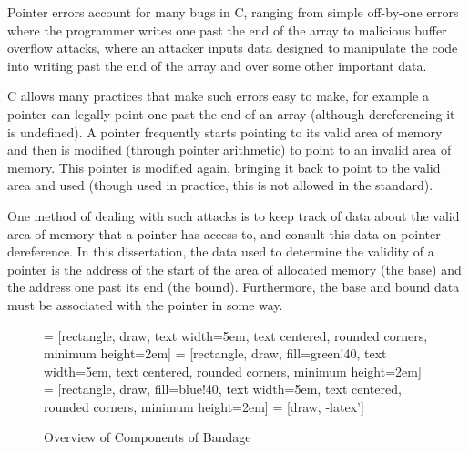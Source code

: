 \documentclass[a4paper,12pt,twoside,openright]{report}
\begin{document}
Pointer errors account for many bugs in C, ranging from simple off-by-one errors where the programmer writes one past the end of the array to malicious buffer overflow attacks, where an attacker inputs data designed to manipulate the code into writing past the end of the array and over some other important data.

C allows many practices that make such errors easy to make, for example a pointer can legally point one past the end of an array (although dereferencing it is undefined).
A pointer frequently starts pointing to its valid area of memory and then is modified (through pointer arithmetic) to point to an invalid area of memory.
This pointer is modified again, bringing it back to point to the valid area and used (though used in practice, this is not allowed in the standard).

One method of dealing with such attacks is to keep track of data about the valid area of memory that a pointer has access to, and consult this data on pointer dereference.
In this dissertation, the data used to determine the validity of a pointer is the address of the start of the area of allocated memory (the base) and the address one past its end (the bound).
Furthermore, the base and bound data must be associated with the pointer in some way.

\begin{figure}
\centering
{} = [rectangle, draw, 
text width=5em, text centered, rounded corners, minimum height=2em]
 = [rectangle, draw, fill=green!40, 
text width=5em, text centered, rounded corners, minimum height=2em]
 = [rectangle, draw, fill=blue!40, 
text width=5em, text centered, rounded corners, minimum height=2em]
 = [draw, -latex']
\caption{Overview of Components of Bandage}
\label{fig:Components}
\end{figure}
\end{document}
